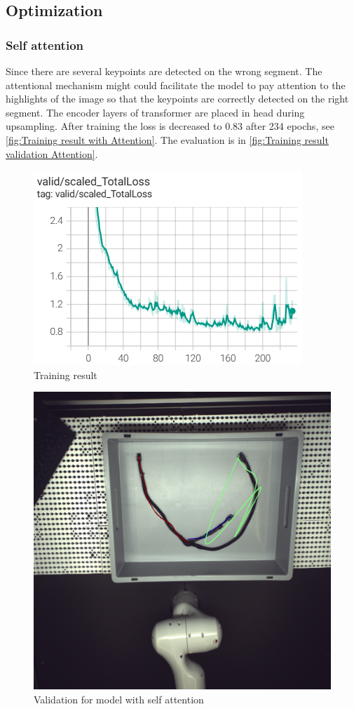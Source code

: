 \subsection{Optimization}
\subsubsection{Self attention}
Since there are several keypoints are detected on the wrong segment. The attentional mechanism might could facilitate the model to pay attention 
to the highlights of the image so that the keypoints are correctly detected on the right segment. The encoder layers of transformer are placed in 
head during upsampling. After training the loss is decreased to 0.83 after 234 epochs, see \autoref{fig:Training result with Attention}. 
The evaluation is in \autoref{fig:Training result validation Attention}.\\
\begin{figure}
	\centering
	\includegraphics[width=0.6\linewidth]{example_images/withAttn_keypoints_100}
	\caption{Training result}
	\label{fig:Training result with Attention}
\end{figure}
\begin{figure}
	\centering
	\includegraphics[width=0.6\linewidth]{example_images/keypoints_100_eval_withAttn}
	\caption{Validation for model with self attention}
	\label{fig:Training result validation Attention}
\end{figure}
